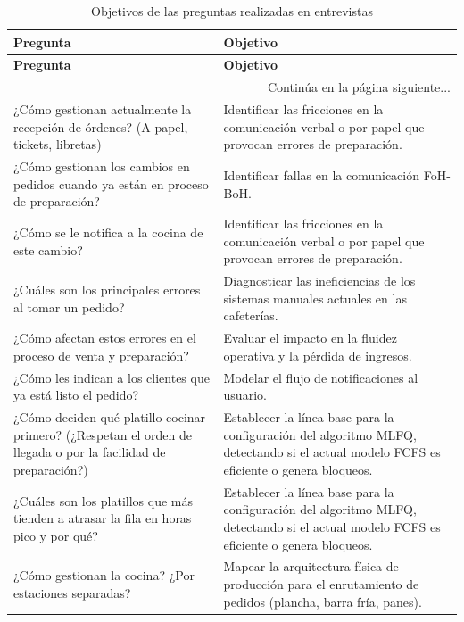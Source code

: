 \begin{longtable}[c]{p{5cm} p{9cm}}
\caption{Objetivos de las preguntas realizadas en entrevistas} \label{tab:objetivos-entrevistas} \\
\toprule
\textbf{Pregunta} & \textbf{Objetivo} \\
\midrule
\endfirsthead

\toprule
\textbf{Pregunta} & \textbf{Objetivo} \\
\midrule
\endhead

\midrule
\multicolumn{2}{r}{\small Continúa en la página siguiente...} \\
\endfoot
\bottomrule
\endlastfoot

¿Cómo gestionan actualmente la recepción de órdenes? (A papel, tickets, libretas)  & Identificar las fricciones en la comunicación verbal o por papel que provocan errores de preparación. \\
\addlinespace
¿Cómo gestionan los cambios en pedidos cuando ya están en proceso de preparación?  & Identificar fallas en la comunicación FoH-BoH. \\
\addlinespace
¿Cómo se le notifica a la cocina de este cambio? & Identificar las fricciones en la comunicación verbal o por papel que provocan errores de preparación. \\
\addlinespace
¿Cuáles son los principales errores al tomar un pedido? & Diagnosticar las ineficiencias de los sistemas manuales actuales en las cafeterías. \\
\addlinespace
¿Cómo afectan estos errores en el proceso de venta y preparación? & Evaluar el impacto en la fluidez operativa y la pérdida de ingresos. \\
\addlinespace
¿Cómo les indican a los clientes que ya está listo el pedido? & Modelar el flujo de notificaciones al usuario. \\
\addlinespace
¿Cómo deciden qué platillo cocinar primero? (¿Respetan el orden de llegada o por la facilidad de preparación?) & Establecer la línea base para la configuración del algoritmo MLFQ, detectando si el actual modelo FCFS es eficiente o genera bloqueos. \\
\addlinespace
¿Cuáles son los platillos que más tienden a atrasar la fila en horas pico y por qué? & Establecer la línea base para la configuración del algoritmo MLFQ, detectando si el actual modelo FCFS es eficiente o genera bloqueos. \\
\addlinespace
¿Cómo gestionan la cocina? ¿Por estaciones separadas? & Mapear la arquitectura física de producción para el enrutamiento de pedidos (plancha, barra fría, panes). \\

\end{longtable}
